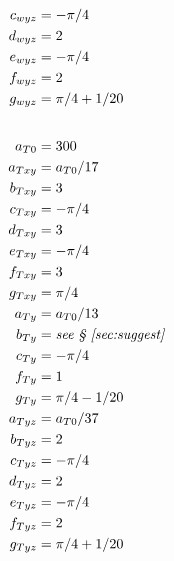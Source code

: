 \documentclass[10pt,reqno]{amsart}
\begin{document}
\begin{table}[p]
\begin{multicols}{3}
\begin{small}
\begin{align*}
c_{wyz} &= - \pi / 4 \\
d_{wyz} &= 2 \\
e_{wyz} &= - \pi / 4 \\
f_{wyz} &= 2 \\
g_{wyz} &= \pi / 4 + 1 / 20 \\
\intertext{}
a_{T0} &= 300 \\
a_{Txy} &= a_{T0} / 17 \\
b_{Txy} &= 3 \\
c_{Txy} &= - \pi / 4 \\
d_{Txy} &= 3 \\
e_{Txy} &= - \pi / 4 \\
f_{Txy} &= 3 \\
g_{Txy} &= \pi / 4 \\
a_{Ty} &= a_{T0} / 13 \\
b_{Ty} &= \text{\emph{see \textsection{}~\ref{sec:suggest}}} \\
c_{Ty} &= - \pi / 4 \\
f_{Ty} &= 1 \\
g_{Ty} &= \pi / 4 - 1 / 20 \\
a_{Tyz} &= a_{T0} / 37 \\
b_{Tyz} &= 2 \\
c_{Tyz} &= - \pi / 4 \\
d_{Tyz} &= 2 \\
e_{Tyz} &= - \pi / 4 \\
f_{Tyz} &= 2 \\
g_{Tyz} &= \pi / 4 + 1 / 20 \\
\end{align*}
\end{small}
\end{multicols}
\caption{Coefficient recommendations from section~\ref{sec:suggest}.
         Standard MKS units are implied with each value; e.g.
         $R$ is given in
         \si{\joule\per\kilo\gram\per\kelvin} and $\mu_r$ is given in
         \si{\pascal\second}.
         Unlisted coefficients should be set to zero.
         \label{tbl:auxcoeff}}
\end{table}
\end{document}
